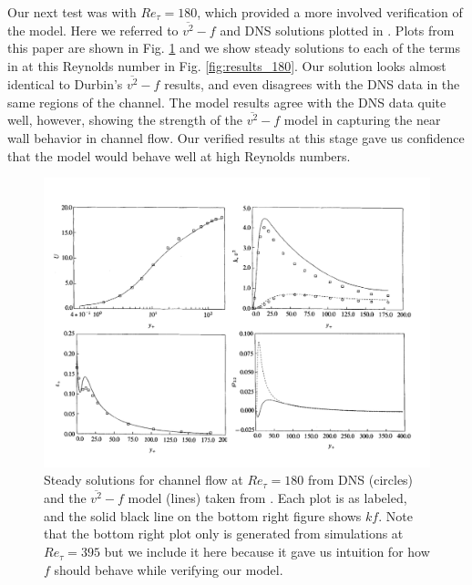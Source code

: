 \documentclass[a4paper,11pt]{article}
\begin{document}
Our next test was with $Re_\tau = 180$, which provided a more involved
verification of the model. Here we referred to $\overline{v^2} - f$ and DNS
solutions plotted in \cite{durbin180}. Plots from this paper are shown in Fig.
\ref{fig:durbin180} and we show steady solutions to each of the terms in
at this Reynolds number in Fig. \ref{fig:results_180}. Our solution looks almost
identical to Durbin's $\overline{v^2}-f$ results, and even disagrees with the DNS
data in the same regions of the channel. The model results agree with the DNS
data quite well, however, showing the strength of the $\overline{v^2}-f$ model
in capturing the near wall behavior in channel flow. Our verified results at
this stage gave us confidence that the model would behave well at high Reynolds
numbers.

\begin{figure}
 \centering
 \includegraphics[width=\textwidth]{durbin180}
 \caption{Steady solutions for channel flow at $Re_\tau=180$ from DNS (circles)
and the $\overline{v^2}-f$ model (lines) taken from \cite{durbin180}. Each plot
is as labeled, and the solid black line on the bottom right figure shows $kf$.
Note that the bottom right plot only is generated from simulations at $Re_\tau =
395$ but we include it here because it gave us intuition for how $f$ should
behave while verifying our model.}
 \label{fig:durbin180}
\end{figure}
\end{document}
